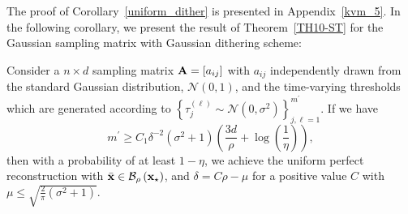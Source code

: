 \documentclass[12pt,draftcls,onecolumn]{IEEEtran}
\begin{document}
The proof of Corollary~\ref{uniform_dither} is presented in Appendix~\ref{kvm_5}. In the following corollary, we present the result of Theorem~\ref{TH10-ST} for the Gaussian sampling matrix with Gaussian dithering scheme:
\begin{corollary}
\label{jennifer}
Consider 
a $n\times d$ sampling matrix $\mathbf{A}=[a_{ij}]$ with $a_{ij}$ independently drawn from the standard Gaussian distribution, $\mathcal{N}(0,1)$, and
the time-varying thresholds which %
are generated according to $\left\{\tau^{(\ell)}_{j}\sim \mathcal{N}\left(0,\sigma^2\right)\right\}_{j,\ell=1}^{m^{\prime}}$. %
If we have
\begin{equation}
\label{jen_1}
m^{\prime}\geq C_1\delta^{-2}\left(\sigma^2+1\right)\left(\frac{3d}{\rho}+\log\left(\frac{1}{\eta}\right)\right),
\end{equation}
then with a probability of at least $1-\eta$, we achieve the uniform perfect reconstruction with $\bar{\mathbf{x}}\in\mathcal{B}_\rho\left(\mathbf{x}_{\star}\right)$, and $\delta=C\rho-\mu$ for a positive value $C$ with
$\mu\leq\sqrt{\frac{2}{\pi}\left(\sigma^2+1\right)}$.
\end{corollary}
\end{document}
